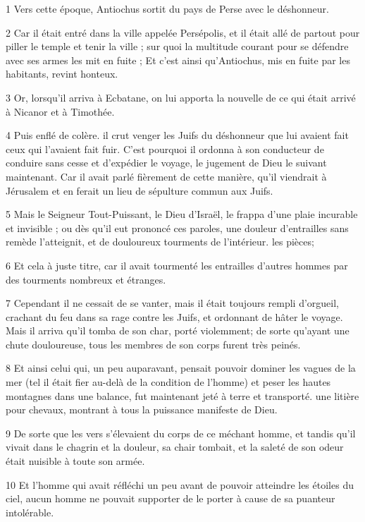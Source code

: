 \par 1 Vers cette époque, Antiochus sortit du pays de Perse avec le déshonneur.
\par 2 Car il était entré dans la ville appelée Persépolis, et il était allé de partout pour piller le temple et tenir la ville ; sur quoi la multitude courant pour se défendre avec ses armes les mit en fuite ; Et c'est ainsi qu'Antiochus, mis en fuite par les habitants, revint honteux.
\par 3 Or, lorsqu'il arriva à Ecbatane, on lui apporta la nouvelle de ce qui était arrivé à Nicanor et à Timothée.
\par 4 Puis enflé de colère. il crut venger les Juifs du déshonneur que lui avaient fait ceux qui l'avaient fait fuir. C'est pourquoi il ordonna à son conducteur de conduire sans cesse et d'expédier le voyage, le jugement de Dieu le suivant maintenant. Car il avait parlé fièrement de cette manière, qu'il viendrait à Jérusalem et en ferait un lieu de sépulture commun aux Juifs.
\par 5 Mais le Seigneur Tout-Puissant, le Dieu d'Israël, le frappa d'une plaie incurable et invisible ; ou dès qu'il eut prononcé ces paroles, une douleur d'entrailles sans remède l'atteignit, et de douloureux tourments de l'intérieur. les pièces;
\par 6 Et cela à juste titre, car il avait tourmenté les entrailles d'autres hommes par des tourments nombreux et étranges.
\par 7 Cependant il ne cessait de se vanter, mais il était toujours rempli d'orgueil, crachant du feu dans sa rage contre les Juifs, et ordonnant de hâter le voyage. Mais il arriva qu'il tomba de son char, porté violemment; de sorte qu'ayant une chute douloureuse, tous les membres de son corps furent très peinés.
\par 8 Et ainsi celui qui, un peu auparavant, pensait pouvoir dominer les vagues de la mer (tel il était fier au-delà de la condition de l'homme) et peser les hautes montagnes dans une balance, fut maintenant jeté à terre et transporté. une litière pour chevaux, montrant à tous la puissance manifeste de Dieu.
\par 9 De sorte que les vers s'élevaient du corps de ce méchant homme, et tandis qu'il vivait dans le chagrin et la douleur, sa chair tombait, et la saleté de son odeur était nuisible à toute son armée.
\par 10 Et l'homme qui avait réfléchi un peu avant de pouvoir atteindre les étoiles du ciel, aucun homme ne pouvait supporter de le porter à cause de sa puanteur intolérable.
